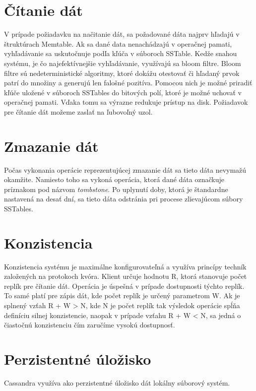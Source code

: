 \documentclass[11pt,twoside,a4paper]{book}
\begin{document}

\section{Čítanie dát}
V prípade požiadavku na načitanie dát, sa požadované dáta najprv hľadajú v štruktúrach Memtable. Ak sa dané data nenachádzajú v operačnej pamati, vyhľadávanie sa uskutočnuje podľa kľúča v súboroch SSTable. Kedže snahou systému, je čo najefektívnejšie vyhľadávanie, využívajú sa bloom filtre. Bloom filtre sú nedeterministické algoritmy, ktoré dokážu otestovať či hľadaný prvok patrí do množiny a generujú len falošné pozitíva. Pomocou nich je možné priradiť kľúče uložené v súboroch SSTables do bitových polí, ktoré je možné uchovať v operačnej pamati. Vďaka tomu sa výrazne redukuje prístup na disk. Požiadavok pre čítanie dát možeme zaslať na ľubovoľný uzol.

\section{Zmazanie dát}
Počas vykonania operácie reprezentujúcej zmazanie dát sa tieto dáta nevymažú okamžite. Namiesto toho sa vykoná operácia, ktorá dané dáta označkuje príznakom pod názvom \emph{tombstone}. Po uplynutí doby, ktorá je štandardne nastavená na desať dní, sa tieto dáta odstránia pri procese zlievajúcom súbory SSTables.
 

\section{Konzistencia}

Konzistencia systému je maximálne konfigurovateľná a využíva princípy techník založených na protokoch kvóra. Klient určuje hodnotu R, ktorá stanovuje počet replík pre čítanie dát. Operácia je úspešná v prípade dostupnosti týchto replík. To samé platí pre zápis dát, kde počet replík je určený parametrom W. Ak je splnený vzťah R + W > N, kde N je počet replík tak výsledok operácie spĺňa definíciu silnej konzistencie, naopak v prípade vzťahu R + W < N, sa jedná o čiastočnú konzistenciu čím zaručíme vysokú dostupnosť.


\section{Perzistentné úložisko}

Cassandra využíva ako perzistentné úložisko dát lokálny súborový systém.
\end{document}
